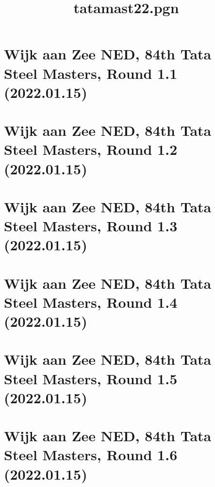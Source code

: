 \documentclass[11pt]{article}
\title{tatamast22.pgn}
\newcommand*\cleartoleftpage{%
   \clearpage
   \ifodd\value{page}\hbox{}\newpage\fi
}
\begin{document}
\maketitle

\newpage

\tableofcontents
\newpage

\printindex

\cleartoleftpage
\section{Wijk aan Zee NED, 84th Tata Steel Masters, Round 1.1 (2022.01.15)}


\cleartoleftpage

\section{Wijk aan Zee NED, 84th Tata Steel Masters, Round 1.2 (2022.01.15)}


\cleartoleftpage

\section{Wijk aan Zee NED, 84th Tata Steel Masters, Round 1.3 (2022.01.15)}


\cleartoleftpage

\section{Wijk aan Zee NED, 84th Tata Steel Masters, Round 1.4 (2022.01.15)}


\cleartoleftpage

\section{Wijk aan Zee NED, 84th Tata Steel Masters, Round 1.5 (2022.01.15)}


\cleartoleftpage

\section{Wijk aan Zee NED, 84th Tata Steel Masters, Round 1.6 (2022.01.15)}

\end{document}
